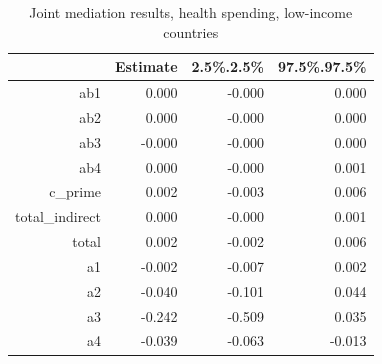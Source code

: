 \begin{table}[ht]
\centering
\begin{tabular}{rrrr}
  \hline
 & Estimate & 2.5\%.2.5\% & 97.5\%.97.5\% \\ 
  \hline
ab1 & 0.000 & -0.000 & 0.000 \\ 
  ab2 & 0.000 & -0.000 & 0.000 \\ 
  ab3 & -0.000 & -0.000 & 0.000 \\ 
  ab4 & 0.000 & -0.000 & 0.001 \\ 
  c\_prime & 0.002 & -0.003 & 0.006 \\ 
  total\_indirect & 0.000 & -0.000 & 0.001 \\ 
  total & 0.002 & -0.002 & 0.006 \\ 
  a1 & -0.002 & -0.007 & 0.002 \\ 
  a2 & -0.040 & -0.101 & 0.044 \\ 
  a3 & -0.242 & -0.509 & 0.035 \\ 
  a4 & -0.039 & -0.063 & -0.013 \\ 
   \hline
\end{tabular}
\caption{Joint mediation results, health spending, low-income countries} 
\end{table}
